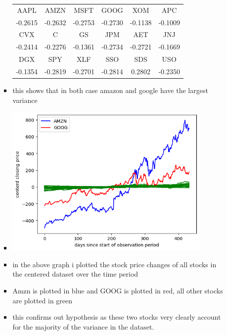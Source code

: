 \documentclass[12pt,twoside]{article}
\begin{document}
\begin{enumerate}
\begin{enumerate}
\begin{itemize}
\begin{center}
    \begin{tabular}{c|c|c|c|c|c}
    AAPL & AMZN & MSFT & GOOG & XOM & APC\\
    -0.2615 & -0.2632 & -0.2753 & -0.2730 & -0.1138 & -0.1009\\
    \hline
    CVX & C & GS & JPM & AET & JNJ\\
    -0.2414 & -0.2276 & -0.1361 & -0.2734 & -0.2721 & -0.1669\\
    \hline
    DGX & SPY & XLF & SSO & SDS & USO\\
    -0.1354 & -0.2819 & -0.2701 & -0.2814 & 0.2802 & -0.2350\\
    \end{tabular}
    \end{center}
  \item this shows that in both case amazon and google have the largest variance
  \item \includegraphics[width=10cm]{homework/homework_8/images/h8_1.png}
    \item in the above graph i plotted the stock price changes of all stocks in the centered dataset over the time period
    \item Amzn is plotted in blue and GOOG is plotted in red, all other stocks are plotted in green 
    \item this confirms out hypothesis as these two stocks very clearly account for the majority of the variance in the dataset. 
\end{itemize}
    

\end{enumerate}
\end{enumerate}
\end{document}
